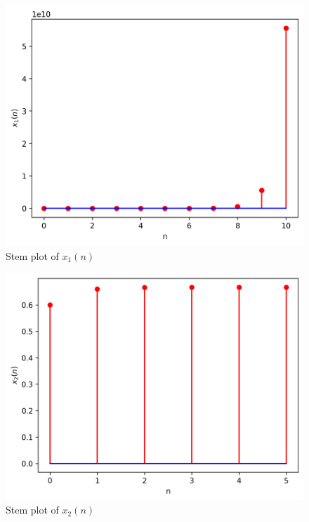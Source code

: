 \documentclass[journal,12pt,twocolumn]{IEEEtran}
\theoremstyle{remark}
\begin{document}
\begin{figure}[h!]
    \centering
    \includegraphics[width=\columnwidth]{figs/plot.png}
    \caption{Stem plot of $x_1(n)$}
    \label{fig:sr4}
\end{figure}
\begin{figure}[h!]
    \centering
    \includegraphics[width=\columnwidth]{figs/plot1.png}
    \caption{Stem plot of $x_2(n)$}
    \label{fig:sr7}
\end{figure}
\end{document}
